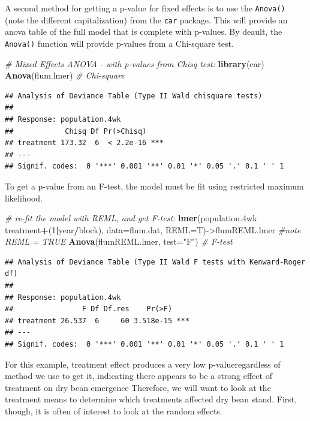 \documentclass[letterpaper,]{book}
\newenvironment{Shaded}{\begin{snugshade}}{\end{snugshade}}
\newcommand{\CommentTok}[1]{\textcolor[rgb]{0.56,0.35,0.01}{\textit{#1}}}
\newcommand{\DataTypeTok}[1]{\textcolor[rgb]{0.13,0.29,0.53}{#1}}
\newcommand{\DecValTok}[1]{\textcolor[rgb]{0.00,0.00,0.81}{#1}}
\newcommand{\FloatTok}[1]{\textcolor[rgb]{0.00,0.00,0.81}{#1}}
\newcommand{\KeywordTok}[1]{\textcolor[rgb]{0.13,0.29,0.53}{\textbf{#1}}}
\newcommand{\NormalTok}[1]{#1}
\newcommand{\OperatorTok}[1]{\textcolor[rgb]{0.81,0.36,0.00}{\textbf{#1}}}
\newcommand{\StringTok}[1]{\textcolor[rgb]{0.31,0.60,0.02}{#1}}
\begin{document}
A second method for getting a p-value for fixed effects is to use the \texttt{Anova()} (note the different capitalization) from the \texttt{car} package. This will provide an anova table of the full model that is complete with p-values. By deault, the \texttt{Anova()} function will provide p-values from a Chi-square test.

\begin{Shaded}
\begin{Highlighting}[]
\CommentTok{# Mixed Effects ANOVA - with p-values from Chisq test:}
\KeywordTok{library}\NormalTok{(car)}
\KeywordTok{Anova}\NormalTok{(flum.lmer) }\CommentTok{# Chi-square}
\end{Highlighting}
\end{Shaded}

\begin{verbatim}
## Analysis of Deviance Table (Type II Wald chisquare tests)
## 
## Response: population.4wk
##            Chisq Df Pr(>Chisq)    
## treatment 173.32  6  < 2.2e-16 ***
## ---
## Signif. codes:  0 '***' 0.001 '**' 0.01 '*' 0.05 '.' 0.1 ' ' 1
\end{verbatim}

To get a p-value from an F-test, the model must be fit using restricted maximum likelihood.

\begin{Shaded}
\begin{Highlighting}[]
\CommentTok{# re-fit the model with REML, and get F-test:}
\KeywordTok{lmer}\NormalTok{(population}\FloatTok{.4}\NormalTok{wk }\OperatorTok{~}\StringTok{ }\NormalTok{treatment}\OperatorTok{+}\NormalTok{(}\DecValTok{1}\OperatorTok{|}\NormalTok{year}\OperatorTok{/}\NormalTok{block), }
     \DataTypeTok{data=}\NormalTok{flum.dat, }\DataTypeTok{REML=}\NormalTok{T)->flumREML.lmer }\CommentTok{#note REML = TRUE}
\KeywordTok{Anova}\NormalTok{(flumREML.lmer, }\DataTypeTok{test=}\StringTok{"F"}\NormalTok{) }\CommentTok{# F-test}
\end{Highlighting}
\end{Shaded}

\begin{verbatim}
## Analysis of Deviance Table (Type II Wald F tests with Kenward-Roger df)
## 
## Response: population.4wk
##                F Df Df.res    Pr(>F)    
## treatment 26.537  6     60 3.518e-15 ***
## ---
## Signif. codes:  0 '***' 0.001 '**' 0.01 '*' 0.05 '.' 0.1 ' ' 1
\end{verbatim}

For this example, treatment effect produces a very low p-valueregardless of method we use to get it, indicating there appears to be a strong effect of treatment on dry bean emergence Therefore, we will want to look at the treatment means to determine which treatments affected dry bean stand. First, though, it is often of interest to look at the random effects.
\end{document}
